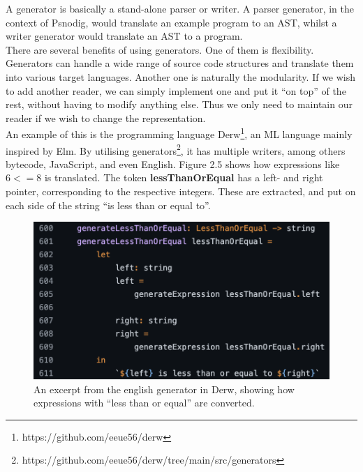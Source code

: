 A generator is basically a stand-alone parser or writer. A parser generator, in the context of Psnodig, would translate an example program to an AST, whilst a writer generator would translate an AST to a program. \hfill \\

There are several benefits of using generators. One of them is flexibility. Generators can handle a wide range of source code structures and translate them into various target languages. Another one is naturally the modularity. If we wish to add another reader, we can simply implement one and put it ``on top'' of the rest, without having to modify anything else. Thus we only need to maintain our reader if we wish to change the representation. \hfill \\

An example of this is the programming language Derw\footnote{https://github.com/eeue56/derw}, an ML language mainly inspired by Elm. By utilising generators\footnote{https://github.com/eeue56/derw/tree/main/src/generators}, it has multiple writers, among others bytecode, JavaScript, and even English. Figure 2.5 shows how expressions like $6 <= 8$ is translated. The token \textbf{lessThanOrEqual} has a left- and right pointer, corresponding to the respective integers. These are extracted, and put on each side of the string ``is less than or equal to''. \hfill \\

\begin{figure}[ht]
    \centering
    \includegraphics[scale=0.7]{assets/derwLTE.png}
    \caption[]{An excerpt from the english generator in Derw, showing how expressions with ``less than or equal'' are converted\footnotemark.}
    \label{fig:derw}
\end{figure}

